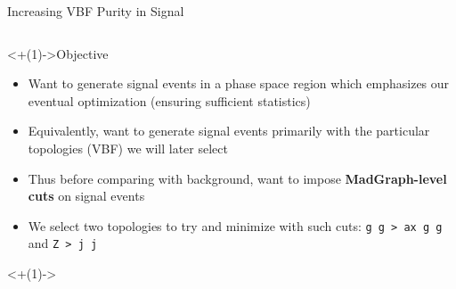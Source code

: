 \documentclass[]{beamer}
\begin{document}
\begin{frame}{Increasing VBF Purity in Signal}
    \begin{columns}
        \begin{column}{0.45\linewidth}
            \begin{block}<+(1)->{Objective}
                \begin{itemize}
                    \item Want to generate signal events in a phase space region which emphasizes our eventual optimization (ensuring sufficient statistics)
                    \item Equivalently, want to generate signal events primarily with the particular topologies (VBF) we will later select
                    \item Thus before comparing with background, want to impose \textbf{MadGraph-level cuts} on signal events
                    \item We select two topologies to try and minimize with such cuts: \texttt{g g > ax g g} and \texttt{Z > j j}
                \end{itemize}
            \end{block}
            
            \smallskip
            
            \centering
            \uncover<+(1)->{
                }
\end{column}
\end{columns}
\end{frame}
\end{document}
